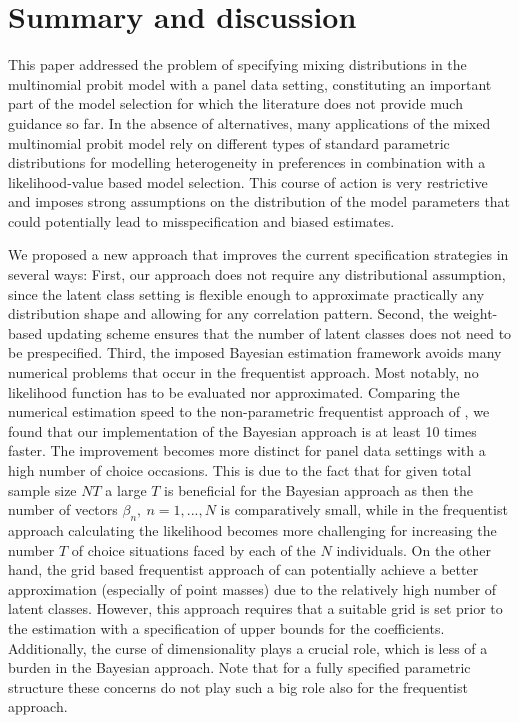 \documentclass[article]{jss}
\begin{document}
\section{Summary and discussion} \label{sec:summary}

This paper addressed the problem of specifying mixing distributions in the multinomial probit model with a panel data setting, constituting an important part of the model selection for which the literature does not provide much guidance so far. In the absence of alternatives, many applications of the mixed multinomial probit model rely on different types of standard parametric distributions for modelling heterogeneity in preferences in combination with a likelihood-value based model selection. This course of action is very restrictive and imposes strong assumptions on the distribution of the model parameters that could potentially lead to misspecification and biased estimates.

We proposed a new approach that improves the current specification strategies in several ways: First, our approach does not require any distributional assumption, since the latent class setting is flexible enough to approximate practically any distribution shape and allowing for any correlation pattern. Second, the weight-based updating scheme ensures that the number of latent classes does not need to be prespecified. Third, the imposed Bayesian estimation framework avoids many numerical problems that occur in the frequentist approach. Most notably, no likelihood function has to be evaluated nor approximated. Comparing the numerical estimation speed to the non-parametric frequentist approach of \cite{Bauer:19}, we found that our implementation of the Bayesian approach is at least 10 times faster. The improvement becomes more distinct for panel data settings with a high number of choice occasions. This is due to the fact that for given total sample size $NT$ a large $T$ is beneficial for the Bayesian approach as then the number of vectors $\beta_n,~ n = 1,...,N$ is comparatively small, while in the frequentist approach calculating the likelihood becomes more challenging for increasing the number $T$ of choice situations faced by each of the $N$ individuals. On the other hand, the grid based frequentist approach of \cite{Bauer:19} can potentially achieve a better approximation (especially of point masses) due to the relatively high number of latent classes. However, this approach requires that a suitable grid is set prior to the estimation with a specification of upper bounds for the coefficients. Additionally, the curse of dimensionality plays a crucial role, which is less of a burden in the Bayesian approach. Note that for a fully specified parametric structure these concerns do not play such a big role also for the frequentist approach.
\end{document}
